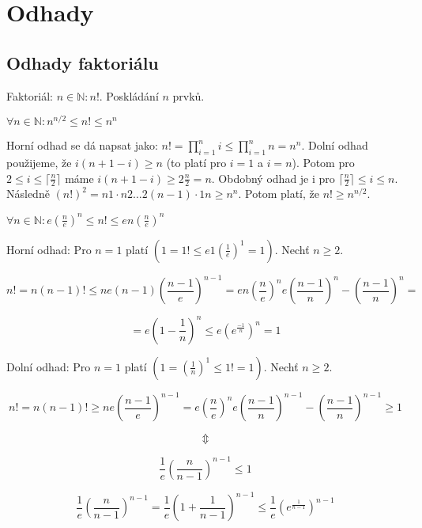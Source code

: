 \chapter{Odhady}

\section{Odhady faktoriálu}

Faktoriál: $n \in \mathbb{N}: n!$. Poskládání $n$ prvků.

\begin{tvrz}
	$\forall n \in \mathbb{N}: n^{n/2} \leq n! \leq n^n$
\end{tvrz}

\begin{dukaz}
	Horní odhad se dá napsat jako: $n! = \prod_{i=1}^{n}i \leq \prod_{i=1}^{n} n = n^{n}$. Dolní odhad použijeme, že $i(n+1 - i) \geq n$ (to platí pro $i=1$ a $i=n$). Potom pro $2 \leq i \leq \lceil \frac{n}{2} \rceil$ máme $i(n+1-i) \geq 2 \frac{n}{2} = n$. Obdobný odhad je i pro $\lceil \frac{n}{2} \rceil \leq i \leq n$. Následně $(n!)^2 = n1 \cdot n2 \dots 2(n-1) \cdot 1n \geq n^{n}$. Potom platí, že $n! \geq n^{n/2}$.
\end{dukaz}

\begin{veta}
	$\forall n \in \mathbb{N}: e (\frac{n}{e})^n \leq n! \leq en(\frac{n}{e})^n$
\end{veta}

\begin{dukaz}
	Horní odhad: Pro $n = 1$ platí $(1 = 1! \leq e 1 \left( \frac{1}{e} \right)^{1} = 1)$. Nechť $n \geq 2$.
	
	$$
	n! = n (n-1)! \leq n e (n-1)\left( \frac{n-1}{e} \right)^{n-1} = e n \left( \frac{n}{e} \right)^{n}e \left( \frac{n-1}{n} \right)^{n} - \left( \frac{n-1}{n} \right)^{n} =
	$$
	
	$$
	= e \left( 1 - \frac{1}{n} \right)^{n} \leq e \left( e^{\frac{-1}{n}} \right)^{n} = 1
	$$
	
	Dolní odhad: Pro $n = 1$ platí $(1 = \left( \frac{1}{n} \right)^{1} \leq 1! = 1)$. Nechť $n \geq 2$.
	
	$$
	n! = n(n-1)! \geq n e \left( \frac{n-1}{e} \right)^{n-1} = e \left( \frac{n}{e} \right)^{n} e \left( \frac{n-1}{n} \right)^{n-1} - \left( \frac{n-1}{n} \right)^{n-1} \geq 1
	$$
	
	$$
	\Updownarrow
	$$
	
	$$
	\frac{1}{e} \left( \frac{n}{n-1} \right)^{n-1} \leq 1
	$$
	
	$$
	\frac{1}{e} \left( \frac{n}{n-1} \right)^{n-1} = \frac{1}{e} \left( 1 + \frac{1}{n-1} \right)^{n-1} \leq \frac{1}{e} \left( e^{\frac{1}{n-1}} \right)^{n-1}
	$$
\end{dukaz}

